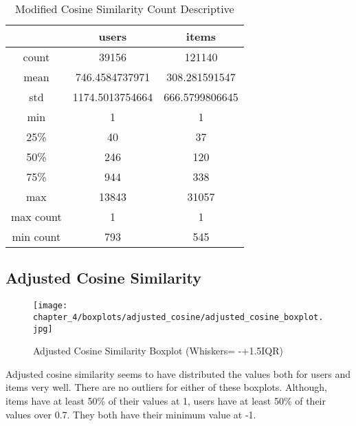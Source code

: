 \begin{table}[H]
\centering
\caption{Modified Cosine Similarity Count Descriptive}
\label{table:modified_cosine_similarity_count_descriptive}
\begin{tabular}{|c|c|c|}
\hline
          & \textbf{users}  & \textbf{items} \\ \hline
count     & 39156           & 121140         \\ \hline
mean      & 746.4584737971  & 308.281591547  \\ \hline
std       & 1174.5013754664 & 666.5799806645 \\ \hline
min       & 1               & 1              \\ \hline
25\%      & 40              & 37             \\ \hline
50\%      & 246             & 120            \\ \hline
75\%      & 944             & 338            \\ \hline
max       & 13843           & 31057          \\ \hline
max count & 1               & 1              \\ \hline
min count & 793             & 545            \\ \hline
\end{tabular}
\end{table}

\subsection{Adjusted Cosine Similarity}

\begin{figure}[H]
\centering
\texttt{[image: chapter\_4/boxplots/adjusted\_cosine/adjusted\_cosine\_boxplot.jpg]}
\caption{Adjusted Cosine Similarity Boxplot (Whiskers= -+1.5IQR)}
\label{figure:adjusted_cosine_similarity_boxplot}
\end{figure}

Adjusted cosine similarity seems to have distributed the values both for users and items very well.
There are no outliers for either of these boxplots. Although, items have at least 50\% of their
values at 1, users have at least 50\% of their values over 0.7. They both have their minimum
value at -1.

